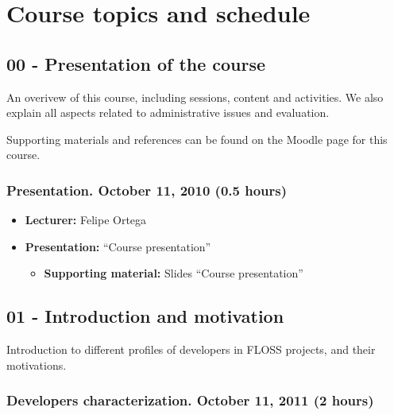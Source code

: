 \documentclass[a4paper]{article}
\begin{document}
\section{Course topics and schedule}

\subsection{00 - Presentation of the course}

An overivew of this course, including sessions, content and activities. We also explain all aspects related to administrative issues and evaluation.

Supporting materials and references can be found on the Moodle page for this course.

\subsubsection{Presentation. October 11, 2010 (0.5 hours)}

\begin{itemize}
\item \textbf{Lecturer:} Felipe Ortega
\item \textbf{Presentation:} ``Course presentation''
  \begin{itemize}
  \item \textbf{Supporting material:} Slides ``Course presentation''
  \end{itemize}
\end{itemize}

\subsection{01 - Introduction and motivation}

Introduction to different profiles of developers in FLOSS projects, and their motivations.

\subsubsection{Developers characterization. October 11, 2011 (2 hours)}
\end{document}
